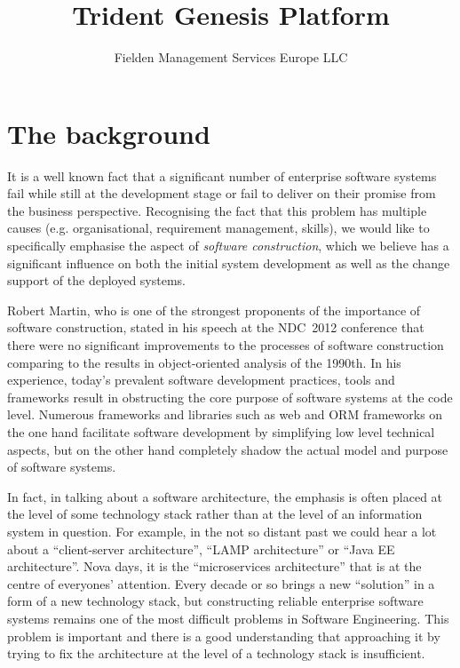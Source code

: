 \documentclass[a4paper,12pt,oneside,openright,final]{memoir} %
\title{Trident Genesis Platform}
\author{Fielden Management Services Europe LLC}
\date{}
\begin{document}
\maketitle
{}


\onehalfspacing


\section*{The background}

	It is a well known fact that a significant number of enterprise software systems fail while still at the development stage or fail to deliver on their promise from the business perspective.  
  	Recognising the fact that this problem has multiple causes (e.g. organisational, requirement management, skills), we would like to specifically emphasise the aspect of \emph{software construction}, which we believe has a significant influence on both the initial system development as well as the change support of the deployed systems.  
  
  	Robert Martin, who is one of the strongest proponents of the importance of software construction, stated in his speech at the NDC~2012 conference that there were no significant improvements to the processes of software construction comparing to the results in object-oriented analysis of the 1990th. 
  	In his experience, today's prevalent software development practices, tools and frameworks result in obstructing the core purpose of software systems at the code level.
  	Numerous frameworks and libraries such as web and ORM frameworks on the one hand facilitate software development by simplifying low level technical aspects, but on the other hand completely shadow the actual model and purpose of software systems.  
  	
	In fact, in talking about a software architecture, the emphasis is often placed at the level of some technology stack rather than at the level of an information system in question.
	For example, in the not so distant past we could hear a lot about a ``client-server architecture'', ``LAMP architecture'' or ``Java EE architecture''.
	Nova days, it is the ``microservices architecture'' that is at the centre of everyones' attention.
	Every decade or so brings a new ``solution'' in a form of a new technology stack, but constructing reliable enterprise software systems remains one of the most difficult problems in Software Engineering.	
	This problem is important and there is a good understanding that approaching it by trying to fix the architecture at the level of a technology stack is insufficient.
\end{document}
